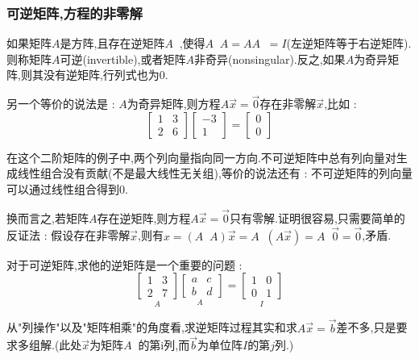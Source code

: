 \documentclass[UTF8,12pt]{ctexbook}
\DeclareMathOperator{\inverse}{^{-1}}
\begin{document}
{{{{\subsubsection{可逆矩阵,方程的非零解}{
  如果矩阵$A$是方阵,且存在逆矩阵$A\inverse$,使得$A\inverse A = AA\inverse = I$(左逆矩阵等于右逆矩阵).则称矩阵$A$可逆(invertible),或者矩阵$A$非奇异(nonsingular).反之,如果$A$为奇异矩阵,则其没有逆矩阵,行列式也为0.

  另一个等价的说法是 : $A$为奇异矩阵,则方程$A\vec{x} = \vec{0}$存在非零解$\vec{x}$,比如 :
  $$
    \begin{bmatrix}
      1 & 3 \\
      2 & 6
    \end{bmatrix}
    \begin{bmatrix}
      -3 \\
      1
    \end{bmatrix}
    =
    \begin{bmatrix}
      0 \\
      0
    \end{bmatrix}
  $$

  在这个二阶矩阵的例子中,两个列向量指向同一方向.不可逆矩阵中总有列向量对生成线性组合没有贡献(不是最大线性无关组),等价的说法还有 : 不可逆矩阵的列向量可以通过线性组合得到$0$.

  换而言之,若矩阵$A$存在逆矩阵,则方程$A\vec{x} = \vec{0}$只有零解.证明很容易,只需要简单的反证法 : 假设存在非零解$\vec{x}$,则有$x = (A\inverse A)\vec{x} = A\inverse(A\vec{x}) = A\inverse\vec{0} = \vec{0}$,矛盾.

  对于可逆矩阵,求他的逆矩阵是一个重要的问题 :
  $$
    \underset{A}{\begin{bmatrix}
        1 & 3 \\
        2 & 7
      \end{bmatrix}}
    \underset{A\inverse}{\begin{bmatrix}
        a & c \\
        b & d
      \end{bmatrix}}
    =
    \underset{I}{\begin{bmatrix}
        1 & 0 \\
        0 & 1
      \end{bmatrix}}
  $$

  从"列操作"以及"矩阵相乘"的角度看,求逆矩阵过程其实和求$A\vec{x} = \vec{b}$差不多,只是要求多组解.(此处$\vec{x}$为矩阵$A\inverse$的第i列,而$\vec{b}$为单位阵$I$的第$j$列.)
}%

}}}}
\end{document}

